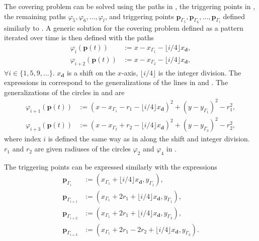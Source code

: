 The covering problem can be solved using the paths in , the triggering points in , the remaining paths $\varphi_5,\varphi_6,\dots,\varphi_l$, and triggering points $\mathbf{p}_{\Gamma_5},\mathbf{p}_{\Gamma_6},\dots,\mathbf{p}_{\Gamma_l}$ defined similarly to . A generic solution for the covering problem defined as a pattern iterated over time is then defined with the paths
\begin{subequations}\label{eq:line-gene}\begin{align}
  \varphi_i(\mathbf{p}(t))&:=x-x_{\Gamma_1}-\lfloor i/4\rfloor x_\mathbf{d},\\
  \varphi_{i+2}(\mathbf{p}(t))&:=x-x_{\Gamma_2}-\lfloor i/4\rfloor x_\mathbf{d},
\end{align}
\end{subequations}
$\forall i\in\{1,5,9,\dots\}$. $x_\mathbf{d}$ is a shift on the $x$-axis, $\lfloor i/4\rfloor$ is the integer division. The expressions in  correspond to the generalizations of the lines in  and . The generalizations of the circles in  and  are
\begin{subequations}\label{eq:circ-gene}\begin{align}
  \varphi_{i+1}(\mathbf{p}(t))&:=(x-x_{\Gamma_1}-r_1-\lfloor i/4\rfloor x_\mathbf{d})^2+(y-y_{\Gamma_1})^2-r_1^2,\\
  \varphi_{i+3}(\mathbf{p}(t))&:=(x-x_{\Gamma_2}+r_2-\lfloor i/4\rfloor x_\mathbf{d})^2+(y-y_{\Gamma_3})^2-r_2^2,\label{eq:second-circ-gene}
\end{align}
\end{subequations}
where index $i$ is defined the same way as in  along the shift and integer division. $r_1$ and $r_2$ are given radiuses of the circles $\varphi_2$ and $\varphi_4$ in .

The triggering points can be expressed similarly with the expressions
\begin{subequations}\label{eq:trigs-gene}\begin{align}
  \mathbf{p}_{\Gamma_i}&:=(x_{\Gamma_1}+\lfloor i/4\rfloor x_\mathbf{d},y_{\Gamma_1}),\\
  \mathbf{p}_{\Gamma_{i+1}}&:=(x_{\Gamma_1}+2r_1+\lfloor i/4\rfloor x_\mathbf{d},y_{\Gamma_1}),\\
  \mathbf{p}_{\Gamma_{i+2}}&:=(x_{\Gamma_1}+2r_1+\lfloor i/4\rfloor x_\mathbf{d},y_{\Gamma_3}),\\
  \mathbf{p}_{\Gamma_{i+3}}&:=(x_{\Gamma_1}+2r_1-2r_2+\lfloor i/4\rfloor x_\mathbf{d},y_{\Gamma_3})\label{eq:last-trig-gene}.
\end{align}
\end{subequations}

